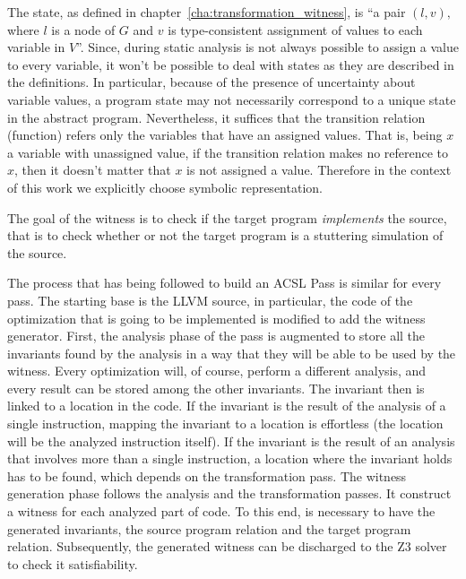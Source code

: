 The state, as defined in chapter~\ref{cha:transformation_witness}, is ``a pair $(l, v),$ where $l$ is a node of $G$ and $v$ is type-consistent assignment of values to each variable in $V$''. Since, during static analysis is not always possible to assign a value to every variable, it won't be possible to deal with states as they are described in the definitions. In particular, because of the presence of uncertainty about variable values, a program state may not necessarily correspond to a unique state in the abstract program. Nevertheless, it suffices that the transition relation (function) refers only the variables that have an assigned values. That is, being $x$ a variable with unassigned value, if the transition relation makes no reference to $x$, then it doesn't matter that $x$ is not assigned a value. Therefore in the context of this work we explicitly choose symbolic representation.

The goal of the witness is to check if the target program \emph{implements} the source, that is to check whether or not the target program is a stuttering simulation of the source.

The process that has being followed to build an ACSL Pass is similar for every pass. The starting base is the LLVM source, in particular, the code of the optimization that is going to be implemented is modified to add the witness generator. First, the analysis phase of the pass is augmented to store all the invariants found by the analysis in a way that they will be able to be used by the witness. Every optimization will, of course, perform a different analysis, and every result can be stored among the other invariants. The invariant then is linked to a location in the code. If the invariant is the result of the analysis of a single instruction, mapping the invariant to a location is effortless (the location will be the analyzed instruction itself). If the invariant is the result of an analysis that involves more than a single instruction, a location where the invariant holds has to be found, which depends on the transformation pass. The witness generation phase follows the analysis and the transformation passes. It construct a witness for each analyzed part of code. To this end, is necessary to have the generated invariants, the source program relation and the target program relation. Subsequently, the generated witness can be discharged to the Z3 solver to check it satisfiability.

